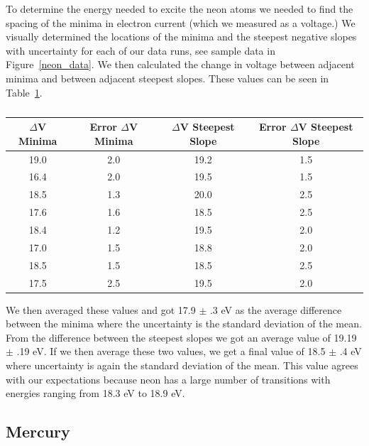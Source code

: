 \documentclass[prb,preprint]{revtex4-1}
\begin{document}
To determine the energy needed to excite the neon atoms we needed to find the spacing of the minima in electron current (which we measured as a voltage.) We visually determined the locations of the minima and the steepest negative slopes with uncertainty for each of our data runs, see sample data in Figure~\ref{neon_data}. We then calculated the change in voltage between adjacent minima and between adjacent steepest slopes. These values can be seen in Table~\ref{neon_dvs}.

\begin{table}[h!]
\centering
\caption{ }
\begin{ruledtabular}
\begin{tabular}{c c c c}
$\Delta$V Minima & Error $\Delta$V Minima & $\Delta$V Steepest Slope &  Error $\Delta$V Steepest Slope\\
\hline	%
19.0 & 2.0 & 19.2 & 1.5  \\
16.4 & 2.0 & 19.5 & 1.5  \\
18.5 & 1.3 & 20.0 & 2.5  \\
17.6 & 1.6 & 18.5 & 2.5  \\
18.4 & 1.2 & 19.5 & 2.0  \\
17.0 & 1.5 & 18.8 & 2.0  \\
18.5 & 1.5 & 18.5 & 2.5  \\
17.5 & 2.5 & 19.5 & 2.0  \\

\end{tabular}
\end{ruledtabular}
\label{neon_dvs}
\end{table}

We then averaged these values and got 17.9 $\pm$ .3 eV as the average difference between the minima where the uncertainty is the standard deviation of the mean. From the difference between the steepest slopes we got an average value of 19.19 $\pm$ .19 eV. If we then average these two values, we get a final value of 18.5 $\pm$ .4 eV where uncertainty is again the standard deviation of the mean. This value agrees with our expectations because neon has a large number of transitions with energies ranging from 18.3 eV to 18.9 eV.

\subsection{Mercury}
\end{document}
